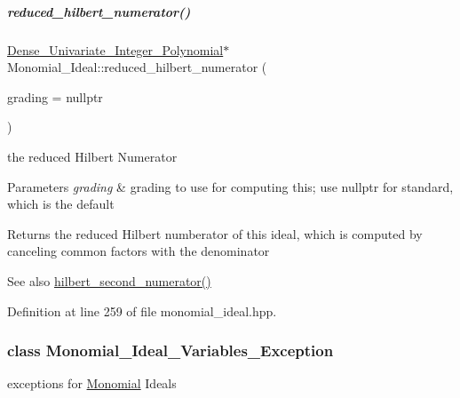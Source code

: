 \mbox{\label{group__polygroup_a814e71b7c8df465869708bbcdf8f6007}} 
\subparagraph{\texorpdfstring{reduced\+\_\+hilbert\+\_\+numerator()}{reduced\_hilbert\_numerator()}}
{\footnotesize\ttfamily \hyperlink{group__polygroup_class_dense___univariate___integer___polynomial}{Dense\+\_\+\+Univariate\+\_\+\+Integer\+\_\+\+Polynomial}$\ast$ Monomial\+\_\+\+Ideal\+::reduced\+\_\+hilbert\+\_\+numerator (\begin{DoxyParamCaption}\item[{const W\+T\+\_\+\+T\+Y\+PE $\ast$}]{grading = {\ttfamily nullptr} }\end{DoxyParamCaption})\hspace{0.3cm}{\ttfamily [inline]}}



the reduced Hilbert Numerator 


\begin{DoxyParams}{Parameters}
{\em grading} & grading to use for computing this; use {\ttfamily nullptr} for standard, which is the default \\
\hline
\end{DoxyParams}
\begin{DoxyReturn}{Returns}
the reduced Hilbert numberator of this ideal, which is computed by canceling common factors with the denominator 
\end{DoxyReturn}
\begin{DoxySeeAlso}{See also}
\hyperlink{group__commalg_ga572e81ac2dce2e17ab459e9a0b687084}{hilbert\+\_\+second\+\_\+numerator()} 
\end{DoxySeeAlso}


Definition at line 259 of file monomial\+\_\+ideal.\+hpp.

\label{class_monomial___ideal___variables___exception}
\subsubsection{class Monomial\+\_\+\+Ideal\+\_\+\+Variables\+\_\+\+Exception}
exceptions for \hyperlink{group__polygroup_class_monomial}{Monomial} Ideals 

